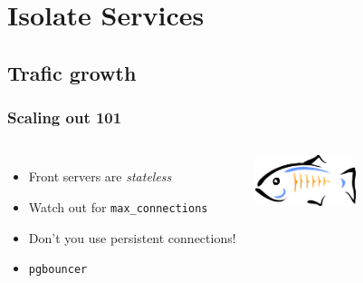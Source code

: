 \documentclass[english]{beamer}
\begin{document}
\section{Isolate Services}
\subsection{Trafic growth}
\frame{\tableofcontents[currentsubsection]}

\begin{frame}[fragile]
  \frametitle{Scaling out 101}

  \vfill

\begin{columns}[c]

  \begin{itemize}
   \item<1-> Front servers are \textit{stateless}
   \item<1-> Watch out for \texttt{max\_connections}
   \item<1-> Don't you use persistent connections!
   \item<2-> \texttt{pgbouncer}
  \end{itemize}  

\includegraphics[height=4em]{bouncer.png}
\end{columns}
\end{frame}


\end{document}

